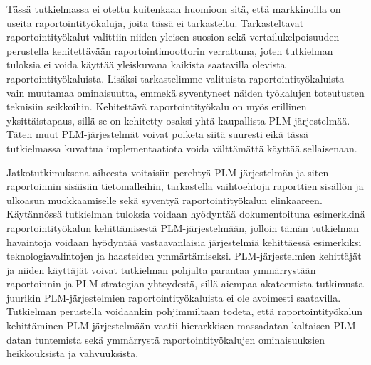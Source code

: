 Tässä tutkielmassa ei otettu kuitenkaan huomioon sitä, että markkinoilla on useita raportointityökaluja, joita tässä ei tarkasteltu. Tarkasteltavat raportointityökalut valittiin niiden yleisen suosion sekä vertailukelpoisuuden perustella kehitettävään raportointimoottorin verrattuna, joten tutkielman tuloksia ei voida käyttää yleiskuvana kaikista saatavilla olevista raportointityökaluista. Lisäksi tarkastelimme valituista raportointityökaluista vain muutamaa ominaisuutta, emmekä syventyneet näiden työkalujen toteutusten teknisiin seikkoihin. Kehitettävä raportointityökalu on myös erillinen yksittäistapaus, sillä se on kehitetty osaksi yhtä kaupallista PLM-järjestelmää. Täten muut PLM-järjestelmät voivat poiketa siitä suuresti eikä tässä tutkielmassa kuvattua implementaatiota voida välttämättä käyttää sellaisenaan.

Jatkotutkimuksena aiheesta voitaisiin perehtyä PLM-järjestelmän ja siten raportoinnin sisäisiin tietomalleihin, tarkastella vaihtoehtoja raporttien sisällön ja ulkoasun muokkaamiselle sekä syventyä raportointityökalun elinkaareen. Käytännössä tutkielman tuloksia voidaan hyödyntää dokumentoituna esimerkkinä raportointityökalun kehittämisestä PLM-järjestelmään, jolloin tämän tutkielman havaintoja voidaan hyödyntää vastaavanlaisia järjestelmiä kehittäessä esimerkiksi teknologiavalintojen ja haasteiden ymmärtämiseksi. PLM-järjestelmien kehittäjät ja niiden käyttäjät voivat tutkielman pohjalta parantaa ymmärrystään raportoinnin ja PLM-strategian yhteydestä, sillä aiempaa akateemista tutkimusta juurikin PLM-järjestelmien raportointityökaluista ei ole avoimesti saatavilla. Tutkielman perustella voidaankin pohjimmiltaan todeta, että raportointityökalun kehittäminen PLM-järjestelmään vaatii hierarkkisen massadatan kaltaisen PLM-datan tuntemista sekä ymmärrystä raportointityökalujen ominaisuuksien heikkouksista ja vahvuuksista.

